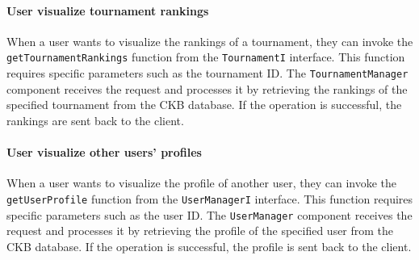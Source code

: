 \paragraph{User visualize tournament rankings}
When a user wants to visualize the rankings of a tournament, they can invoke the \verb|getTournamentRankings| function from the \verb|TournamentI| interface. This function requires specific parameters such as the tournament ID.
The \verb|TournamentManager| component receives the request and processes it by retrieving the rankings of the specified tournament from the CKB database. If the operation is successful, the rankings are sent back to the client.

\paragraph{User visualize other users' profiles}
When a user wants to visualize the profile of another user, they can invoke the \verb|getUserProfile| function from the \verb|UserManagerI| interface. This function requires specific parameters such as the user ID.
The \verb|UserManager| component receives the request and processes it by retrieving the profile of the specified user from the CKB database. If the operation is successful, the profile is sent back to the client.


